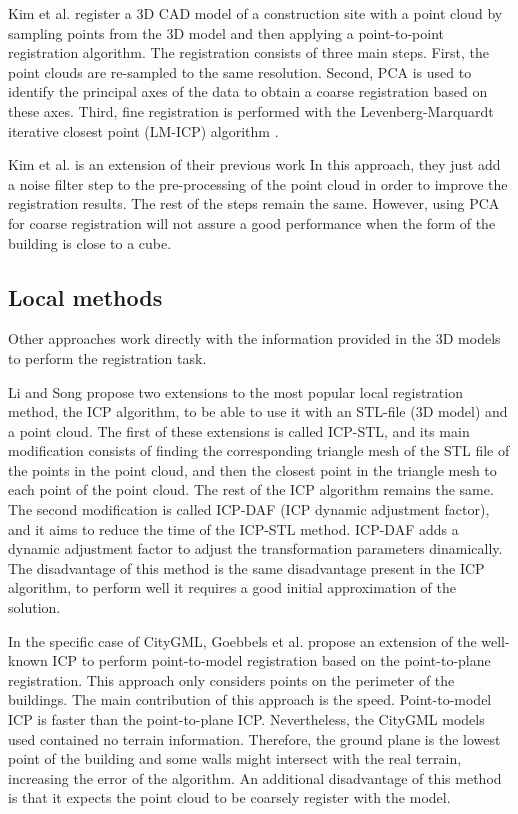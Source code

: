        Kim et al. \cite{Kim_2011_fully} register a 3D CAD model of a construction site with a point cloud by sampling points from the 3D model 
        and then applying a point-to-point registration algorithm. The registration consists of three main steps. First, 
        the point clouds are re-sampled to the same resolution. Second, PCA is used to identify the principal axes of the data 
        to obtain a coarse registration based on these axes. Third, fine registration is performed with the Levenberg-Marquardt
        iterative closest point (LM-ICP) algorithm \cite{Fitzgibbon_2003_robust}. 
        
        Kim et al. \cite{Kim_2013_fully} is an extension of their previous work \cite{Kim_2011_fully}
        In this approach, they just add a noise filter step to the pre-processing of the point cloud in order to improve the registration results.
        The rest of the steps remain the same.
        However, using PCA for coarse registration will not assure a good performance when the form of the building is close to a cube.
        
        \subsection{Local methods}

        Other approaches work directly with the information provided in the 3D models to perform the registration task.

        Li and Song \cite{Li_2015_amodified} propose two extensions to the most popular local registration method, the ICP algorithm, 
        to be able to use it with an STL-file (3D model) and a point cloud.
        The first of these extensions is called ICP-STL, and its main modification consists of finding the corresponding triangle mesh of the STL file of the points 
        in the point cloud, and then the closest point in the triangle mesh to each point of the point cloud. The rest of the ICP algorithm remains the same.
        The second modification is called ICP-DAF (ICP dynamic adjustment factor), and it aims to reduce the time of the ICP-STL method. 
        ICP-DAF adds a dynamic adjustment factor to adjust the transformation parameters dinamically.
        The disadvantage of this method is the same disadvantage present in the ICP algorithm, to perform well it requires a good initial approximation of the solution.

        In the specific case of CityGML, Goebbels et al. \cite{Goebbels_2019_icpcitygml} propose an extension of the well-known ICP
        to perform point-to-model registration based on the point-to-plane registration.
        This approach only considers points on the perimeter of the buildings.
        The main contribution of this approach is the speed. Point-to-model ICP is faster than the point-to-plane ICP.
        Nevertheless, the CityGML models used contained no terrain information. 
        Therefore, the ground plane is the lowest point of the building and some walls might intersect with the real terrain, increasing the error of the algorithm.
        An additional disadvantage of this method is that it expects the point cloud to be coarsely register with the model.

